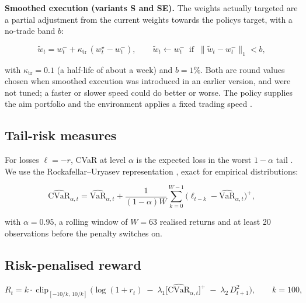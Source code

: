 \documentclass[11pt]{article}
\begin{document}
\textbf{Smoothed execution (variants S and SE).} The weights actually targeted are a partial adjustment from the current weights towards the policy\textquotesingle s target, with a no-trade band \(b\):

\[ \tilde w_t = w^-_t + \kappa_{\mathrm{tr}}\,(w^\star_t - w^-_t),\qquad \tilde w_t \leftarrow w^-_t \ \text{ if } \ \lVert \tilde w_t - w^-_t\rVert_1 < b , \]

with \(\kappa_{\mathrm{tr}} = 0.1\) (a half-life of about a week) and \(b = 1\%\). Both are round values chosen when smoothed execution was introduced in an earlier version, and were not tuned; a faster or slower speed could do better or worse. The policy supplies the aim portfolio and the environment applies a fixed trading speed \cite{r46}.

\subsection{Tail-risk measures}\label{tail-risk-measures}

For losses \(\ell = -r\), CVaR at level \(\alpha\) is the expected loss in the worst \(1-\alpha\) tail \cite{r43}. We use the Rockafellar--Uryasev representation \cite{r9,r10}, exact for empirical distributions:

\[ \widehat{\mathrm{CVaR}}_{\alpha,t} = \widehat{\mathrm{VaR}}_{\alpha,t} + \frac{1}{(1-\alpha)W}\sum_{k=0}^{W-1}\big(\ell_{t-k} - \widehat{\mathrm{VaR}}_{\alpha,t}\big)^+ , \]

with \(\alpha = 0.95\), a rolling window of \(W = 63\) realised returns and at least 20 observations before the penalty switches on.

\subsection{Risk-penalised reward}\label{risk-penalised-reward}

\[ R_t = k\cdot\operatorname{clip}_{[-10/k,\,10/k]}\Big( \log(1+r_t) \;-\; \lambda_1\big[\widehat{\mathrm{CVaR}}_{\alpha,t}\big]^+ \;-\; \lambda_2\, D_{t+1}^2 \Big),\qquad k = 100, \]
\end{document}
